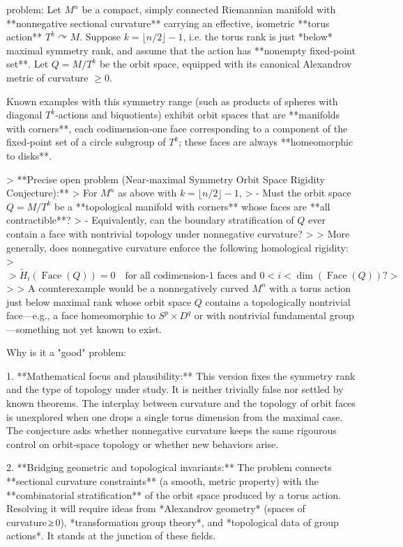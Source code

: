 problem:  
Let \( M^n \) be a compact, simply connected Riemannian manifold with **nonnegative sectional curvature** carrying an effective, isometric **torus action** \(T^k \curvearrowright M\).  Suppose \(k = \lfloor n/2 \rfloor - 1\), i.e. the torus rank is just *below* maximal symmetry rank, and assume that the action has **nonempty fixed‐point set**.  Let \(Q = M/T^k\) be the orbit space, equipped with its canonical Alexandrov metric of curvature \(\ge 0\).

Known examples with this symmetry range (such as products of spheres with diagonal \(T^k\)‐actions and biquotients) exhibit orbit spaces that are **manifolds with corners**, each codimension‑one face corresponding to a component of the fixed‐point set of a circle subgroup of \(T^k\); these faces are always **homeomorphic to disks**.

> **Precise open problem (Near‑maximal Symmetry Orbit Space Rigidity Conjecture):**  
> For \(M^n\) as above with \(k = \lfloor n/2 \rfloor - 1\),  
> - Must the orbit space \(Q = M/T^k\) be a **topological manifold with corners** whose faces are **all contractible**?  
> - Equivalently, can the boundary stratification of \(Q\) ever contain a face with nontrivial topology under nonnegative curvature?  
>  
> More generally, does nonnegative curvature enforce the following homological rigidity:  
> \[
> \widetilde{H}_i(\operatorname{Face}(Q)) = 0 \quad \text{for all codimension‑\(1\) faces and } 0 < i < \dim(\operatorname{Face}(Q)) ?
> \]  
>  
> A counterexample would be a nonnegatively curved \(M^n\) with a torus action just below maximal rank whose orbit space \(Q\) contains a topologically nontrivial face—e.g., a face homeomorphic to \(S^p \times D^q\) or with nontrivial fundamental group—something not yet known to exist.

Why is it a "good" problem:  

1. **Mathematical focus and plausibility:**  
   This version fixes the symmetry rank and the type of topology under study.  It is neither trivially false nor settled by known theorems.  The interplay between curvature and the topology of orbit faces is unexplored when one drops a single torus dimension from the maximal case.  The conjecture asks whether nonnegative curvature keeps the same rigourous control on orbit‑space topology or whether new behaviors arise.

2. **Bridging geometric and topological invariants:**  
   The problem connects **sectional curvature constraints** (a smooth, metric property) with the **combinatorial stratification** of the orbit space produced by a torus action.  Resolving it will require ideas from *Alexandrov geometry* (spaces of curvature ≥ 0), *transformation group theory*, and *topological data of group actions*.  It stands at the junction of these fields.


